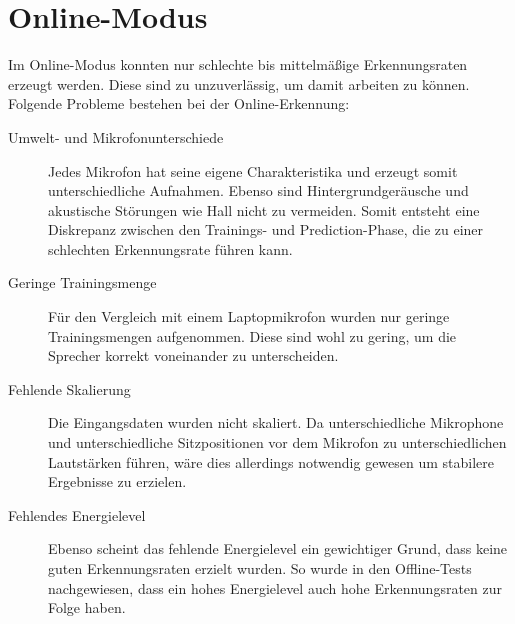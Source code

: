 \section{Online-Modus}
Im Online-Modus konnten nur schlechte bis mittelmäßige Erkennungsraten erzeugt werden. Diese sind zu unzuverlässig, um damit arbeiten zu können. Folgende Probleme bestehen bei der Online-Erkennung:
\begin{description}
	\item[Umwelt- und Mikrofonunterschiede] Jedes Mikrofon hat seine eigene Charakteristika und erzeugt somit unterschiedliche Aufnahmen. Ebenso sind Hintergrundgeräusche und akustische Störungen wie Hall nicht zu vermeiden. Somit entsteht eine Diskrepanz zwischen den Trainings- und Prediction-Phase, die zu einer schlechten Erkennungsrate führen kann.
	\item[Geringe Trainingsmenge] Für den Vergleich mit einem Laptopmikrofon wurden nur geringe Trainingsmengen aufgenommen. Diese sind wohl zu gering, um die Sprecher korrekt voneinander zu unterscheiden.
	\item[Fehlende Skalierung] Die Eingangsdaten wurden nicht skaliert. Da unterschiedliche Mikrophone und unterschiedliche Sitzpositionen vor dem Mikrofon zu unterschiedlichen Lautstärken führen, wäre dies allerdings notwendig gewesen um stabilere Ergebnisse zu erzielen.
	\item[Fehlendes Energielevel] Ebenso scheint das fehlende Energielevel ein gewichtiger Grund, dass keine guten Erkennungsraten erzielt wurden. So wurde in den Offline-Tests nachgewiesen, dass ein hohes Energielevel auch hohe Erkennungsraten zur Folge haben.
\end{description}
